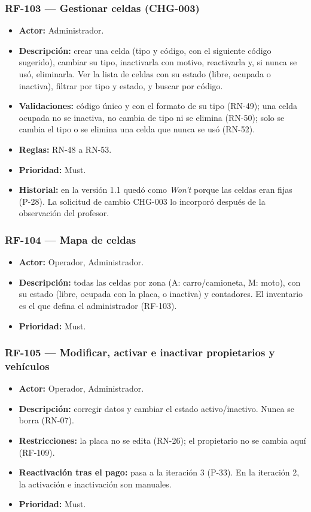 \subsubsection{RF-103 — Gestionar celdas (CHG-003)}
\begin{itemize}
  \item \textbf{Actor:} Administrador.
  \item \textbf{Descripción:} crear una celda (tipo y código, con el siguiente código sugerido), cambiar su tipo, inactivarla con motivo, reactivarla y, si nunca se usó, eliminarla. Ver la lista de celdas con su estado (libre, ocupada o inactiva), filtrar por tipo y estado, y buscar por código.
  \item \textbf{Validaciones:} código único y con el formato de su tipo (RN-49); una celda ocupada no se inactiva, no cambia de tipo ni se elimina (RN-50); solo se cambia el tipo o se elimina una celda que nunca se usó (RN-52).
  \item \textbf{Reglas:} RN-48 a RN-53.
  \item \textbf{Prioridad:} Must.
  \item \textbf{Historial:} en la versión 1.1 quedó como \emph{Won't} porque las celdas eran fijas (P-28). La solicitud de cambio CHG-003 lo incorporó después de la observación del profesor.
\end{itemize}

\subsubsection{RF-104 — Mapa de celdas}
\begin{itemize}
  \item \textbf{Actor:} Operador, Administrador.
  \item \textbf{Descripción:} todas las celdas por zona (A: carro/camioneta, M: moto), con su estado (libre, ocupada con la placa, o inactiva) y contadores. El inventario es el que defina el administrador (RF-103).
  \item \textbf{Prioridad:} Must.
\end{itemize}

\subsubsection{RF-105 — Modificar, activar e inactivar propietarios y vehículos}
\begin{itemize}
  \item \textbf{Actor:} Operador, Administrador.
  \item \textbf{Descripción:} corregir datos y cambiar el estado activo/inactivo. Nunca se borra (RN-07).
  \item \textbf{Restricciones:} la placa no se edita (RN-26); el propietario no se cambia aquí (RF-109).
  \item \textbf{Reactivación tras el pago:} pasa a la iteración 3 (P-33). En la iteración 2, la activación e inactivación son manuales.
  \item \textbf{Prioridad:} Must.
\end{itemize}

